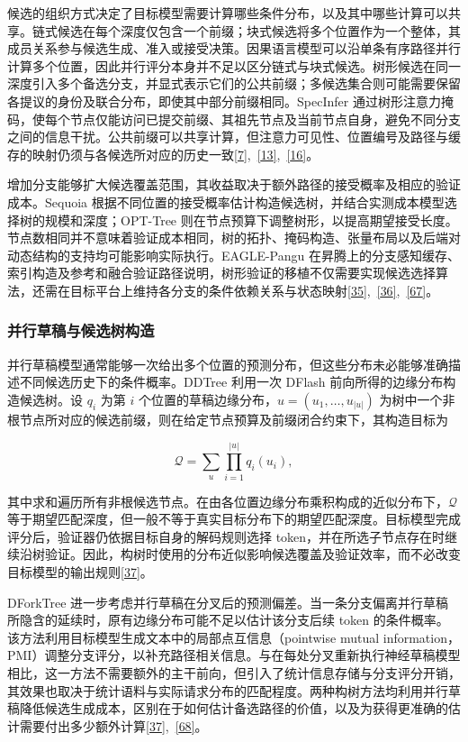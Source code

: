 \documentclass[11pt,a4paper,UTF8,fontset=none,scheme=plain,zihao=-4]{ctexart}
\begin{document}
候选的组织方式决定了目标模型需要计算哪些条件分布，以及其中哪些计算可以共享。链式候选在每个深度仅包含一个前缀；块式候选将多个位置作为一个整体，其成员关系参与候选生成、准入或接受决策。因果语言模型可以沿单条有序路径并行计算多个位置，因此并行评分本身并不足以区分链式与块式候选。树形候选在同一深度引入多个备选分支，并显式表示它们的公共前缀；多候选集合则可能需要保留各提议的身份及联合分布，即使其中部分前缀相同。SpecInfer
通过树形注意力掩码，使每个节点仅能访问已提交前缀、其祖先节点及当前节点自身，避免不同分支之间的信息干扰。公共前缀可以共享计算，但注意力可见性、位置编号及路径与缓存的映射仍须与各候选所对应的历史一致\protect\hyperlink{ref-specinfer}{{[}7{]}},~\protect\hyperlink{ref-zhao2026survey}{{[}13{]}},~\protect\hyperlink{ref-spectr}{{[}16{]}}。

增加分支能够扩大候选覆盖范围，其收益取决于额外路径的接受概率及相应的验证成本。Sequoia
根据不同位置的接受概率估计构造候选树，并结合实测成本模型选择树的规模和深度；OPT-Tree
则在节点预算下调整树形，以提高期望接受长度。节点数相同并不意味着验证成本相同，树的拓扑、掩码构造、张量布局以及后端对动态结构的支持均可能影响实际执行。EAGLE-Pangu
在昇腾上的分支感知缓存、索引构造及参考和融合验证路径说明，树形验证的移植不仅需要实现候选选择算法，还需在目标平台上维持各分支的条件依赖关系与状态映射\protect\hyperlink{ref-sequoia}{{[}35{]}},~\protect\hyperlink{ref-opttree}{{[}36{]}},~\protect\hyperlink{ref-eaglepangu}{{[}67{]}}。

\hypertarget{section-4-1-2}{%
\subsubsection{并行草稿与候选树构造}\label{section-4-1-2}}

并行草稿模型通常能够一次给出多个位置的预测分布，但这些分布未必能够准确描述不同候选历史下的条件概率。DDTree
利用一次 DFlash 前向所得的边缘分布构造候选树。设 \(q_i\) 为第 \(i\)
个位置的草稿边缘分布，\(u=(u_1,\ldots,u_{|u|})\)
为树中一个非根节点所对应的候选前缀，则在给定节点预算及前缀闭合约束下，其构造目标为

\[
\mathcal{Q}=\sum_{u}\prod_{i=1}^{|u|}q_i(u_i),
\]

其中求和遍历所有非根候选节点。在由各位置边缘分布乘积构成的近似分布下，\(\mathcal{Q}\)
等于期望匹配深度，但一般不等于真实目标分布下的期望匹配深度。目标模型完成评分后，验证器仍依据目标自身的解码规则选择
token，并在所选子节点存在时继续沿树验证。因此，构树时使用的分布近似影响候选覆盖及验证效率，而不必改变目标模型的输出规则\protect\hyperlink{ref-ddtree}{{[}37{]}}。

DForkTree
进一步考虑并行草稿在分叉后的预测偏差。当一条分支偏离并行草稿所隐含的延续时，原有边缘分布可能不足以估计该分支后续
token 的条件概率。该方法利用目标模型生成文本中的局部点互信息（pointwise
mutual
information，PMI）调整分支评分，以补充路径相关信息。与在每处分叉重新执行神经草稿模型相比，这一方法不需要额外的主干前向，但引入了统计信息存储与分支评分开销，其效果也取决于统计语料与实际请求分布的匹配程度。两种构树方法均利用并行草稿降低候选生成成本，区别在于如何估计备选路径的价值，以及为获得更准确的估计需要付出多少额外计算\protect\hyperlink{ref-ddtree}{{[}37{]}},~\protect\hyperlink{ref-dforktree}{{[}68{]}}。
\end{document}
